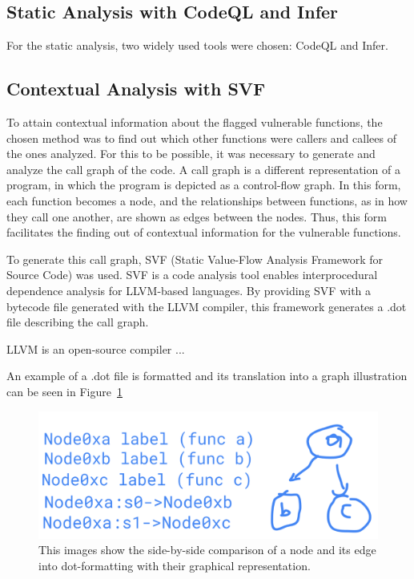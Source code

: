 \subsection{Static Analysis with CodeQL and Infer}
\label{sec:approach:sub:sast}
For the static analysis, two widely used tools were chosen: CodeQL and Infer.

\subsection{Contextual Analysis with SVF}
\label{sec:approach:sub:context}
To attain contextual information about the flagged vulnerable functions, the chosen method was to find out which other functions were callers and callees of the ones analyzed.
For this to be possible, it was necessary to generate and analyze the call graph of the code. 
A call graph is a different representation of a program, in which the program is depicted as a control-flow graph. 
In this form, each function becomes a node, and the relationships between functions, as in how they call one another, are shown as edges between the nodes.
Thus, this form facilitates the finding out of contextual information for the vulnerable functions.

To generate this call graph, SVF (Static Value-Flow Analysis Framework for Source Code) \cite{svf} was used. 
SVF is a code analysis tool enables interprocedural dependence analysis for LLVM-based languages. 
By providing SVF with a bytecode file generated with the LLVM compiler, this framework generates a .dot file describing the call graph. 

LLVM is an open-source compiler ...

An example of a .dot file is formatted and its translation into a graph illustration can be seen in Figure~\ref{fig2}

\begin{figure}
\includegraphics[width=\textwidth]{figures/fig2-callgraph.png}
\caption{This images show the side-by-side comparison of a node and its edge into dot-formatting with their graphical representation.} 
\label{fig2}
\end{figure}

